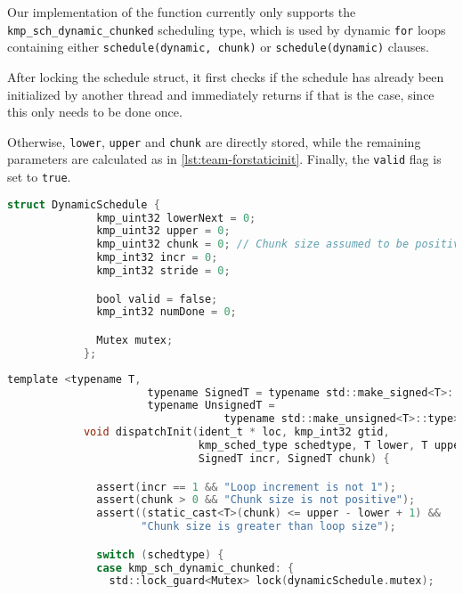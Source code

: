 \begin{itemize}
	      Our implementation of the function currently only supports the
	      \texttt{kmp\_sch\_dynamic\_chunked} scheduling type, which is used by dynamic \texttt{for}
	      loops containing either \texttt{schedule(dynamic, chunk)} or \texttt{schedule(dynamic)}
	      clauses.

	      After locking the schedule struct, it first checks if the schedule has already been
	      initialized by another thread and immediately returns if that is the case, since this only
	      needs to be done once.

	      Otherwise, \texttt{lower}, \texttt{upper} and \texttt{chunk} are directly stored, while
	      the remaining parameters are calculated as in \cref{lst:team-forstaticinit}. Finally, the
	      \texttt{valid} flag is set to \texttt{true}.

	      \begin{lstlisting}[language=C, caption={struct Team::DynamicSchedule},
          label={lst:team-dynamicschedule}, escapechar=@]
            struct DynamicSchedule {
              kmp_uint32 lowerNext = 0;
              kmp_uint32 upper = 0;
              kmp_uint32 chunk = 0; // Chunk size assumed to be positive
              kmp_int32 incr = 0;
              kmp_int32 stride = 0;

              bool valid = false;
              kmp_int32 numDone = 0;

              Mutex mutex;
            };
          \end{lstlisting}

	      \begin{lstlisting}[language=C, caption={void Team::dispatchInit},
          label={lst:team-dispatchinit}, escapechar=@]
            template <typename T,
                      typename SignedT = typename std::make_signed<T>::type,
                      typename UnsignedT =
                                  typename std::make_unsigned<T>::type>
            void dispatchInit(ident_t * loc, kmp_int32 gtid,
                              kmp_sched_type schedtype, T lower, T upper,
                              SignedT incr, SignedT chunk) {

              assert(incr == 1 && "Loop increment is not 1");
              assert(chunk > 0 && "Chunk size is not positive");
              assert((static_cast<T>(chunk) <= upper - lower + 1) &&
                     "Chunk size is greater than loop size");

              switch (schedtype) {
              case kmp_sch_dynamic_chunked: {
                std::lock_guard<Mutex> lock(dynamicSchedule.mutex);


\end{lstlisting}
\end{itemize}
